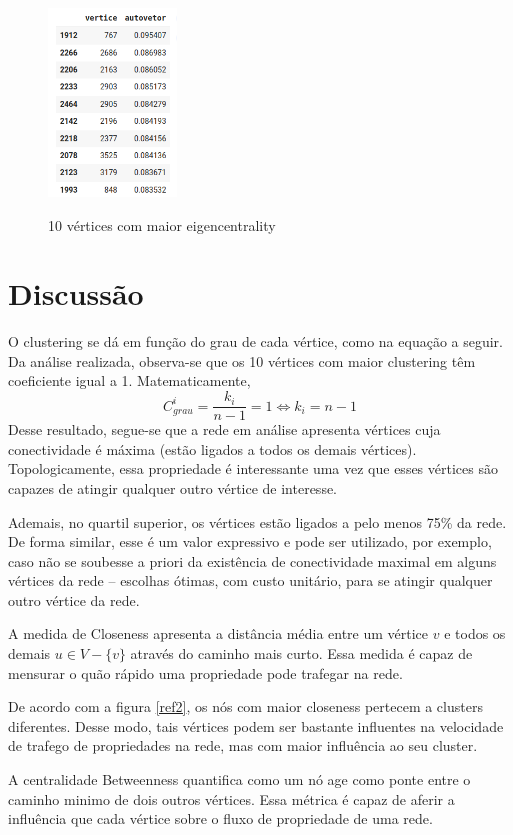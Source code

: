 \documentclass{article}
\begin{document}
\begin{figure}[h!]
	\centering
	\caption{10 vértices com maior eigencentrality}
	\includegraphics[height=5cm]{img/autovetor.png}
	\label{fig:autovetor}
\end{figure}

\section{Discussão}
O clustering se dá em função do grau de cada vértice, como na equação a seguir. 
Da análise realizada, observa-se que os 10 vértices com maior clustering têm coeficiente igual a 1. 
Matematicamente, 
$$C^{i}_{grau} = \frac{k_i}{n-1} = 1 \Longleftrightarrow k_i = n-1$$
Desse resultado, segue-se que a rede em análise apresenta vértices cuja conectividade é máxima (estão ligados a todos os demais vértices). 
Topologicamente, essa propriedade é interessante uma vez que esses vértices são capazes de atingir qualquer outro vértice de interesse. 

Ademais, no quartil superior, os vértices estão ligados a pelo menos 75\% da rede. 
De forma similar, esse é um valor expressivo e pode ser utilizado, por exemplo, caso não se soubesse a priori da existência de conectividade maximal em alguns vértices da rede -- escolhas ótimas, com custo unitário, para se atingir qualquer outro vértice da rede. 

A medida de Closeness apresenta a distância média entre um vértice $v$ e todos os demais $u \in V - \{v\}$ através do caminho mais curto. 
Essa medida é capaz de mensurar o quão rápido uma propriedade pode trafegar na rede. 

De acordo com a figura \ref{ref2}, os nós com maior closeness pertecem a clusters diferentes. 
Desse modo, tais vértices podem ser bastante influentes na velocidade de trafego de propriedades na rede, mas com maior influência ao seu cluster.  

A centralidade Betweenness quantifica como um nó age como ponte entre o caminho minimo de dois outros vértices. 
Essa métrica é capaz de aferir a influência que cada vértice sobre o fluxo de propriedade de uma rede. 
\end{document}
